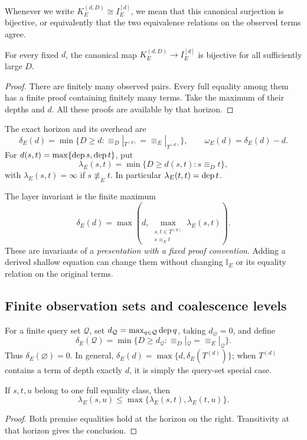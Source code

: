 Whenever we write $K_E^{(d,D)}\cong I_E^{[d]}$, we mean that this canonical
surjection is bijective, or equivalently that the two equivalence
relations on the observed terms agree.

\begin{proposition}\label{prop:eventual}
For every fixed $d$, the canonical map
$K_E^{(d,D)}\to I_E^{[d]}$ is bijective for all sufficiently large $D$.
\end{proposition}
\begin{proof}
There are finitely many observed pairs. Every full equality among them
has a finite proof containing finitely many terms. Take the maximum of
their depths and $d$. All these proofs are available by that horizon.
\end{proof}

\begin{definition}
The exact horizon and its overhead are
\[
\delta_E(d)=\min\{D\ge d:{\equiv_D}|_{T^{(d)}}
 ={\equiv_E}|_{T^{(d)}}\},\qquad
\omega_E(d)=\delta_E(d)-d.
\]
For $d(s,t)=\max\{\operatorname{dep} s,\operatorname{dep} t\}$, put
\[
\lambda_E(s,t)=\min\{D\ge d(s,t):s\equiv_D t\},
\]
with $\lambda_E(s,t)=\infty$ if $s\not\equiv_E t$.
In particular $\lambda_E(t,t)=\operatorname{dep} t$.
\end{definition}

The layer invariant is the finite maximum
\[
\delta_E(d)=\max\left(d,
\max_{\substack{s,t\in T^{(d)}\\s\equiv_E t}}\lambda_E(s,t)\right).
\]
These are invariants of a \emph{presentation with a fixed proof convention}.
Adding a derived shallow equation can change them without changing
$\mathbb I_E$ or its equality relation on the original terms.

\subsection{Finite observation sets and coalescence levels}

For a finite query set $\mathcal Q$, set
$d_{\mathcal Q}=\max_{q\in\mathcal Q}\operatorname{dep} q$, taking $d_\varnothing=0$,
and define
\[
\delta_E(\mathcal Q)=\min\{D\ge d_{\mathcal Q}:
{\equiv_D}|_{\mathcal Q}={\equiv_E}|_{\mathcal Q}\}.
\]
Thus $\delta_E(\varnothing)=0$. In general, $\delta_E(d)=\max\{d,\delta_E(T^{(d)})\}$; when
$T^{(d)}$ contains a term of depth exactly $d$, it is simply the query-set special case.

\begin{proposition}\label{prop:ultra}
If $s,t,u$ belong to one full equality class, then
\[
\lambda_E(s,u)\le
\max\{\lambda_E(s,t),\lambda_E(t,u)\}.
\]
\end{proposition}
\begin{proof}
Both premise equalities hold at the horizon on the right. Transitivity
at that horizon gives the conclusion.
\end{proof}

